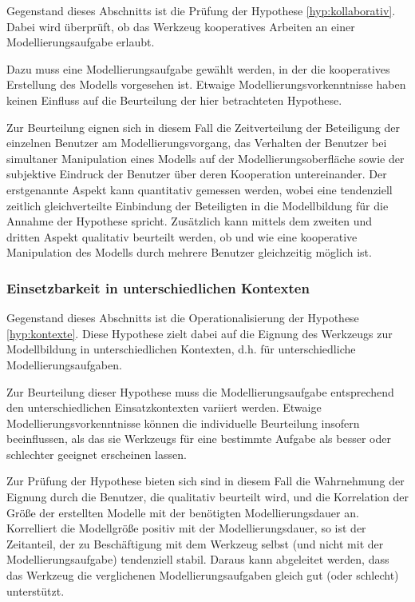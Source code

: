 Gegenstand dieses Abschnitts ist die Prüfung der Hypothese \ref{hyp:kollaborativ}. Dabei wird überprüft, ob das Werkzeug kooperatives Arbeiten an einer Modellierungsaufgabe erlaubt.

Dazu muss eine Modellierungsaufgabe gewählt werden, in der die kooperatives Erstellung des Modells vorgesehen ist. Etwaige Modellierungsvorkenntnisse haben keinen Einfluss auf die Beurteilung der hier betrachteten Hypothese.

Zur Beurteilung eignen sich in diesem Fall die Zeitverteilung der Beteiligung der einzelnen Benutzer am Modellierungsvorgang, das Verhalten der Benutzer bei simultaner Manipulation eines Modells auf der Modellierungsoberfläche sowie der subjektive Eindruck der Benutzer über deren Kooperation untereinander. Der erstgenannte Aspekt kann quantitativ gemessen werden, wobei eine tendenziell zeitlich gleichverteilte Einbindung der Beteiligten in die Modellbildung für die Annahme der Hypothese spricht. Zusätzlich kann mittels dem zweiten und dritten Aspekt qualitativ beurteilt werden, ob und wie eine kooperative Manipulation des Modells durch mehrere Benutzer gleichzeitig möglich ist.


\subsubsection{Einsetzbarkeit in unterschiedlichen Kontexten} %
\label{ssub:einsetzbarkeit_in_unterschiedlichen_kontexten}

Gegenstand dieses Abschnitts ist die Operationalisierung der Hypothese \ref{hyp:kontexte}. Diese Hypothese zielt dabei auf die Eignung des Werkzeugs zur Modellbildung in unterschiedlichen Kontexten, d.h. für unterschiedliche Modellierungsaufgaben. 

Zur Beurteilung dieser Hypothese muss die Modellierungsaufgabe entsprechend den unterschiedlichen Einsatzkontexten variiert werden. Etwaige Modellierungsvorkenntnisse können die individuelle Beurteilung insofern beeinflussen, als das sie Werkzeugs für eine bestimmte Aufgabe als besser oder schlechter geeignet erscheinen lassen.

Zur Prüfung der Hypothese bieten sich sind in diesem Fall die Wahrnehmung der Eignung durch die Benutzer, die qualitativ beurteilt wird, und die Korrelation der Größe der erstellten Modelle mit der benötigten Modellierungsdauer an. Korrelliert die Modellgröße positiv mit der Modellierungsdauer, so ist der Zeitanteil, der zu Beschäftigung mit dem Werkzeug selbst (und nicht mit der Modellierungsaufgabe) tendenziell stabil. Daraus kann abgeleitet werden, dass das Werkzeug die verglichenen Modellierungsaufgaben gleich gut (oder schlecht) unterstützt.

